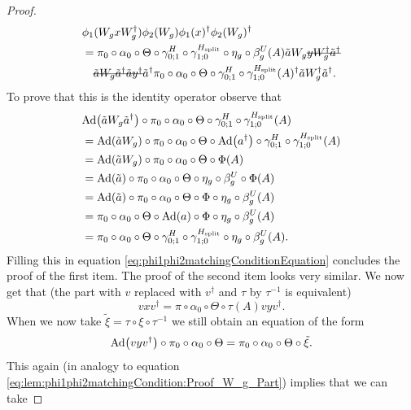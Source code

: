 \documentclass[12pt,a4paper,twoside]{article}
\newcommand{\stkout}[1]{\ifmmode\text{\sout{\ensuremath{#1}}}\else\sout{#1}\fi}
\let\originalleft\left
\let\originalright\right
\renewcommand{\left}{\mathopen{}\mathclose\bgroup\originalleft}
\renewcommand{\right}{\aftergroup\egroup\originalright}
\newcommand{\Ad}[1]{\textrm{Ad}\left(#1\right)}
\theoremstyle{definition}
\numberwithin{equation}{section}
\begin{document}
\begin{proof}
\begin{align}
		&\phi_1(W_gxW_g^\dagger)\phi_2(W_g)\phi_1(x)^\dagger\phi_2(W_g)^\dagger\\
		\label{eq:phi1phi2matchingConditionEquation}
		&=\pi_0\circ\alpha_0\circ\Theta\circ\gamma^{H}_{0;1}\circ\gamma^{H_\text{split}}_{1;0}\circ\eta_g\circ\beta_g^U(A)\tilde{a}W_g\stkout{yW_g^\dagger\tilde{a}^\dagger}\\
		\nonumber
		&\quad\stkout{\tilde{a}W_g\tilde{a}^\dagger\tilde{a}y^\dagger}\tilde{a}^\dagger\pi_0\circ\alpha_0\circ\Theta\circ\gamma^{H}_{0;1}\circ\gamma^{H_\text{split}}_{1;0}(A)^\dagger\tilde{a}W_g^\dagger\tilde{a}^\dagger.
	\end{align}
	To prove that this is the identity operator observe that
	\begin{align}
		&\Ad{\tilde{a}W_g\tilde{a}^\dagger}\circ\pi_0\circ\alpha_0\circ\Theta\circ \gamma^{H}_{0;1}\circ\gamma^{H_\text{split}}_{1;0}(A)\\
		&=\Ad{\tilde{a}W_g}\circ\pi_0\circ\alpha_0\circ\Theta\circ\Ad{a^\dagger}\circ \gamma^{H}_{0;1}\circ\gamma^{H_\text{split}}_{1;0}(A)\\
		&=\Ad{\tilde{a}W_g}\circ\pi_0\circ\alpha_0\circ\Theta\circ\Phi(A)\\
		&=\Ad{\tilde{a}}\circ\pi_0\circ\alpha_0\circ\Theta\circ\eta_g\circ\beta_g^U\circ\Phi(A)\\
		&=\Ad{\tilde{a}}\circ\pi_0\circ\alpha_0\circ\Theta\circ\Phi\circ\eta_g\circ\beta_g^U(A)\\
		&=\pi_0\circ\alpha_0\circ\Theta\circ\Ad{a}\circ\Phi\circ\eta_g\circ\beta_g^U(A)\\
		&=\pi_0\circ\alpha_0\circ\Theta\circ \gamma^{H}_{0;1}\circ\gamma^{H_\text{split}}_{1;0} \circ\eta_g\circ\beta_g^U(A).
	\end{align}
	Filling this in equation \eqref{eq:phi1phi2matchingConditionEquation} concludes the proof of the first item. The proof of the second item looks very similar. We now get that (the part with $v$ replaced with $v^\dagger$ and $\tau$ by $\tau^{-1}$ is equivalent)
	\begin{equation}
		vxv^\dagger=\pi\circ\alpha_0\circ\Theta\circ\tau(A)vyv^\dagger.
	\end{equation}
	When we now take $\tilde\xi=\tau\circ\xi\circ\tau^{-1}$ we still obtain an equation of the form
	\begin{equation}
		\Ad{vyv^\dagger}\circ \pi_0\circ\alpha_0\circ\Theta=\pi_0\circ\alpha_0\circ\Theta\circ\tilde\xi.
	\end{equation}
	This again (in analogy to equation \eqref{eq:lem:phi1phi2matchingCondition:Proof_W_g_Part}) implies that we can take

\end{proof}
\end{document}
